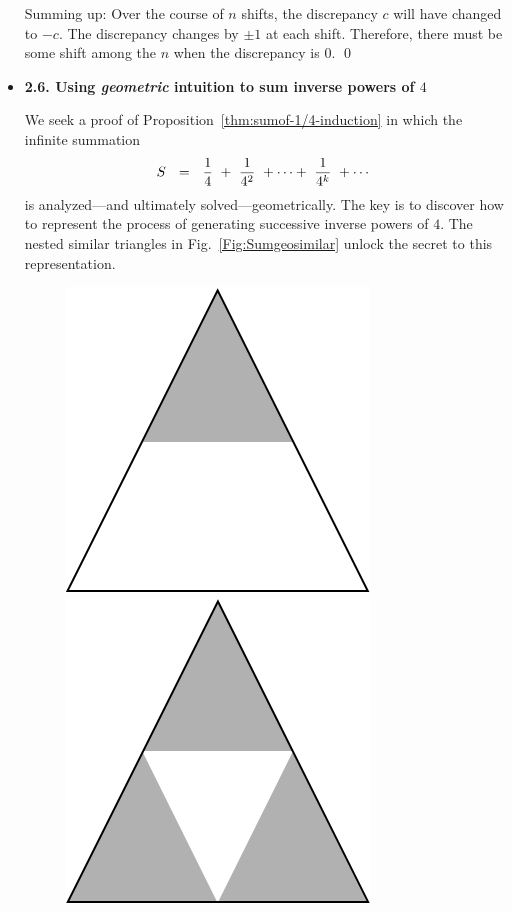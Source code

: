 \begin{itemize}
\smallskip

Summing up: Over the course of $n$ shifts, the discrepancy $c$ will have changed to $-c$.  The  discrepancy changes by $\pm 1$ at each shift.  Therefore, there must be some shift among the $n$ when the discrepancy is $0$.  \qed
 

\medskip \item
{\bf 2.6. Using {\em geometric} intuition to sum inverse powers of $4$}

\smallskip

We seek a proof of Proposition~\ref{thm:sumof-1/4-induction} in which the infinite summation
\[ S \ \ = \ \  {1 \over 4} \ + \  {1 \over 4^2} \ + \cdots + \ {1 \over 4^k} \ + \cdots  \]
is analyzed---and ultimately solved---geometrically.  The key is to discover how to represent the process of generating successive inverse powers of $4$.  The nested similar triangles in Fig.~\ref {Fig:Sumgeosimilar} unlock the secret to this representation.
\begin{figure}[ht]
\begin{center}
        \includegraphics[scale=0.3]{FiguresMaths/Sum1over4topTriangle}
        \hspace{1cm}
        \includegraphics[scale=0.3]{FiguresMaths/Sum1over4similarTriangles}

\end{center}
\end{figure}
\end{itemize}
